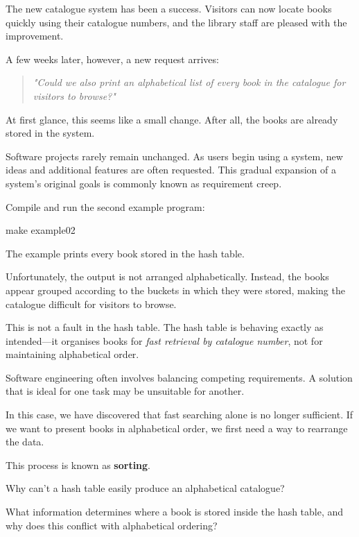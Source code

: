 \documentclass{csc2059practical}
\begin{document}
The new catalogue system has been a success. Visitors can now locate books quickly using their catalogue numbers, and the library staff are pleased with the improvement.

A few weeks later, however, a new request arrives:

\begin{quote}
\emph{"Could we also print an alphabetical list of every book in the catalogue for visitors to browse?"}
\end{quote}

At first glance, this seems like a small change. After all, the books are already stored in the system.

\begin{tipbox}
Software projects rarely remain unchanged. As users begin using a system, new ideas and additional features are often requested. This gradual expansion of a system's original goals is commonly known as requirement creep.
\end{tipbox}

Compile and run the second example program:

\begin{terminal}
make example02
\end{terminal}

The example prints every book stored in the hash table.

Unfortunately, the output is not arranged alphabetically. Instead, the books appear grouped according to the buckets in which they were stored, making the catalogue difficult for visitors to browse.

\begin{importantnote}
This is not a fault in the hash table. The hash table is behaving exactly as intended---it organises books for \emph{fast retrieval by catalogue number}, not for maintaining alphabetical order.
\end{importantnote}

Software engineering often involves balancing competing requirements. A solution that is ideal for one task may be unsuitable for another.

In this case, we have discovered that fast searching alone is no longer sufficient. If we want to present books in alphabetical order, we first need a way to rearrange the data.

This process is known as \textbf{sorting}.

\begin{reflectionbox}
Why can't a hash table easily produce an alphabetical catalogue?

What information determines where a book is stored inside the hash table, and why does this conflict with alphabetical ordering?
\end{reflectionbox}
\end{document}
